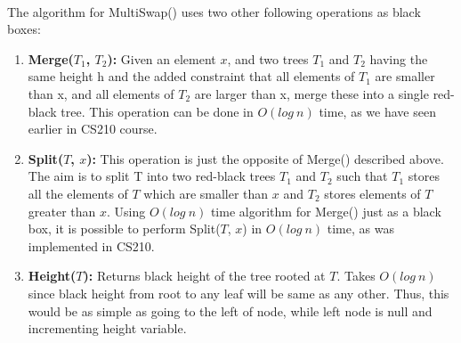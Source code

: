\documentclass[pdftex,a4paper,12pt]{report}
\begin{document}
\paragraph{}
The algorithm for MultiSwap() uses two other following operations as black boxes:
\begin{enumerate}

	\item \textbf{Merge($T_1$, $T_2$):} Given an element $x$, and two trees $T_1$ and $T_2$ having the same height h and the added 
	constraint that all elements of $T_1$ are smaller than x, and all elements of $T_2$ are larger than x, merge these into 
	a single red-black tree. This operation can be done in $O(log\ n)$ time, as we have seen earlier in CS210 course.

	\item \textbf{Split($T$, $x$):} This operation is just the opposite of Merge() described above. The aim is to split 
	T into two red-black trees $T_1$ and $T_2$ such that $T_1$ stores all the elements of $T$ which are smaller 
	than $x$ and $T_2$ stores elements of $T$ greater than $x$. Using $O(log\ n)$ time algorithm for Merge() just 
	as a black box, it is possible to perform Split($T$, $x$) in $O(log\ n)$ time, as was implemented in CS210.
	
	\item \textbf{Height($T$):} Returns black height of the tree rooted at $T$. Takes $O(log\ n)$ since black height from 
	root to any leaf will be same as any other. Thus, this would be as simple as going to the left of node, while left
	node is null and incrementing height variable.
\end{enumerate}
\end{document}
